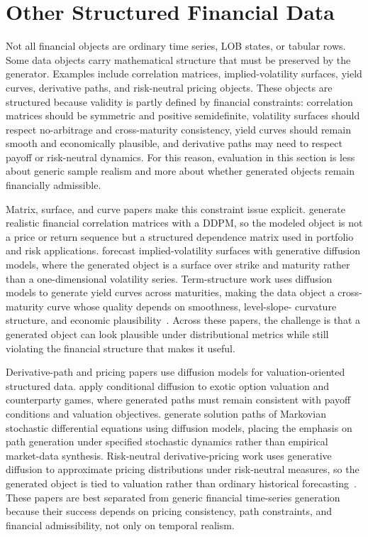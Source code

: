 \documentclass[sigconf,nonacm]{acmart}
\begin{document}
\section{Other Structured Financial Data}\label{sec:structured}

Not all financial objects are ordinary time series, LOB states, or tabular rows.
Some data objects carry mathematical structure that must be preserved by the
generator. Examples include correlation matrices, implied-volatility surfaces,
yield curves, derivative paths, and risk-neutral pricing objects. These objects
are structured because validity is partly defined by financial constraints:
correlation matrices should be symmetric and positive semidefinite, volatility
surfaces should respect no-arbitrage and cross-maturity consistency, yield curves
should remain smooth and economically plausible, and derivative paths may need to
respect payoff or risk-neutral dynamics. For this reason, evaluation in this
section is less about generic sample realism and more about whether generated
objects remain financially admissible.

Matrix, surface, and curve papers make this constraint issue explicit.
\citet{kubiak2024corrddpm} generate realistic financial correlation matrices
with a DDPM, so the modeled object is not a price or return sequence but a
structured dependence matrix used in portfolio and risk applications.
\citet{jin2025ivsurface} forecast implied-volatility surfaces with generative
diffusion models, where the generated object is a surface over strike and
maturity rather than a one-dimensional volatility series. Term-structure work
uses diffusion models to generate yield curves across maturities, making the data
object a cross-maturity curve whose quality depends on smoothness, level-slope-
curvature structure, and economic plausibility~\cite{fukunishi2025termstructure}.
Across these papers, the challenge is that a generated object can look plausible
under distributional metrics while still violating the financial structure that
makes it useful.

Derivative-path and pricing papers use diffusion models for valuation-oriented
structured data. \citet{zhao2025exotic} apply conditional diffusion to exotic
option valuation and counterparty games, where generated paths must remain
consistent with payoff conditions and valuation objectives. \citet{gao2025sdepaths}
generate solution paths of Markovian stochastic differential equations using
diffusion models, placing the emphasis on path generation under specified
stochastic dynamics rather than empirical market-data synthesis. Risk-neutral
derivative-pricing work uses generative diffusion to approximate pricing
distributions under risk-neutral measures, so the generated object is tied to
valuation rather than ordinary historical forecasting~\cite{tiwari2026riskneutral}.
These papers are best separated from generic financial time-series generation
because their success depends on pricing consistency, path constraints, and
financial admissibility, not only on temporal realism.
\end{document}
